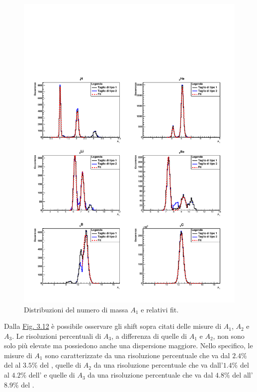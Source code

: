 \documentclass[12pt,a4paper,twoside]{report}
\begin{document}
	\begin{figure}[H]
		\centering
		\includegraphics[width=0.98\linewidth]{c_Total_black_blue1.pdf}
		\caption{Distribuzioni del numero di massa $A_1$ e relativi fit.}
		\label{fig:a1_fragments_final}
	\end{figure}
	Dalla \hyperref[fig:number_mass_resolution]{Fig. 3.12} è possibile osservare gli shift sopra citati delle misure di $A_1$, $A_2$ e $A_3$. Le risoluzioni percentuali di $A_3$, a differenza di quelle di $A_1$ e $A_2$, non sono solo più elevate ma possiedono anche una dispersione maggiore. Nello specifico, le misure di $A_1$ sono caratterizzate da una risoluzione percentuale che va dal $2.4\%$ del  al $3.5\%$ del , quelle di $A_2$ da una risoluzione percentuale che va dall'$1.4\%$ del  al $4.2\%$ dell' e quelle di $A_3$ da una risoluzione percentuale che va dal $4.8\%$ del  all'$8.9\%$ del .
\end{document}
